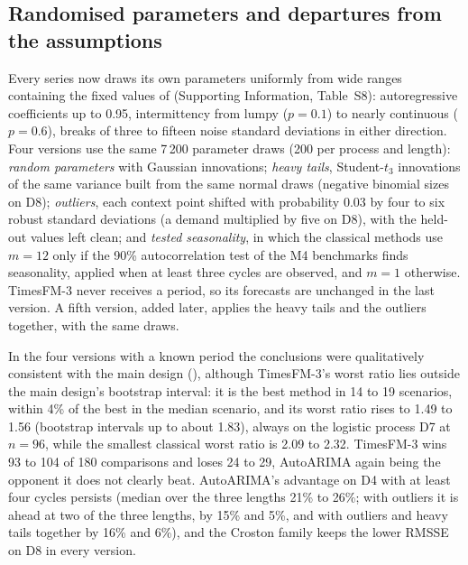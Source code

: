 \subsection{Randomised parameters and departures from the assumptions}
\label{sec:departures}

Every series now draws its own parameters uniformly from wide ranges containing the fixed values of
 (Supporting Information, Table~S8): autoregressive coefficients up to 0.95,
intermittency from lumpy ($p = 0.1$) to nearly continuous ($p = 0.6$), breaks of three to fifteen noise
standard deviations in either direction. Four versions use the same 7\,200 parameter draws (200 per process
and length): \emph{random parameters} with Gaussian innovations; \emph{heavy tails}, Student-$t_3$
innovations of the same variance built from the same normal draws (negative binomial sizes on D8);
\emph{outliers}, each context point shifted with probability 0.03 by four to six robust standard deviations
(a demand multiplied by five on D8), with the held-out values left clean; and \emph{tested seasonality}, in
which the classical methods use $m = 12$ only if the 90\% autocorrelation test of the M4 benchmarks
\citep{makridakis2020m4} finds seasonality, applied when at least three cycles are observed, and $m = 1$
otherwise. TimesFM-3 never receives a period, so its forecasts are unchanged in the last version. A fifth
version, added later, applies the heavy tails and the outliers together, with the same draws.



In the four versions with a known period the conclusions were qualitatively consistent with the main
design (), although TimesFM-3's worst ratio lies outside the main design's
bootstrap interval: it is the best method in 14 to 19 scenarios, within 4\% of the best in the median scenario, and
its worst ratio rises to 1.49 to 1.56 (bootstrap intervals up to about 1.83), always on the logistic process
D7 at $n = 96$, while the smallest classical worst ratio is 2.09 to 2.32. TimesFM-3 wins 93 to 104 of 180 comparisons and loses 24 to 29, AutoARIMA again being the opponent it does not clearly beat. AutoARIMA's
advantage on D4 with at least four cycles persists (median over the three lengths 21\% to 26\%; with outliers it is ahead at two of the three lengths, by 15\% and 5\%, and with outliers and heavy
tails together by 16\% and 6\%), and the Croston family keeps the lower
RMSSE on D8 in every version.

